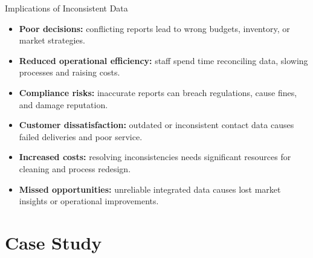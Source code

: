 \documentclass[aspectratio=169, table]{beamer}
\begin{document}
\begin{frame}{Implications of Inconsistent Data}
	\vspace{20pt}
	
	\begin{itemize}
		\item \textbf{Poor decisions:} conflicting reports lead to wrong budgets, inventory, or market strategies.
		
		\item \textbf{Reduced operational efficiency:} staff spend time reconciling data, slowing processes and raising costs.
		
		\item \textbf{Compliance risks:} inaccurate reports can breach regulations, cause fines, and damage reputation.
		
		\item \textbf{Customer dissatisfaction:} outdated or inconsistent contact data causes failed deliveries and poor service.
		
		\item \textbf{Increased costs:} resolving inconsistencies needs significant resources for cleaning and process redesign.
		
		\item \textbf{Missed opportunities:} unreliable integrated data causes lost market insights or operational improvements.
	\end{itemize}
	
\end{frame}

\section{Case Study}
\end{document}
